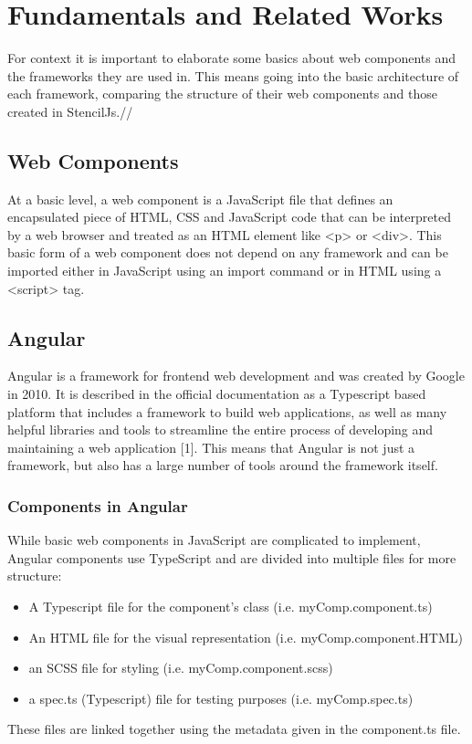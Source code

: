 \chapter{Fundamentals and Related Works}
\label{cha:Fundamentals}
For context it is important to elaborate some basics about web components and the frameworks they are used in. This means going into the basic architecture of each framework, comparing the structure of their web components and those created in StencilJs.//

\section{Web Components}
At a basic level, a web component is a JavaScript file that defines an encapsulated piece of HTML, CSS and JavaScript code that can be interpreted by a web browser and treated as an HTML element like <p> or <div>. This basic form of a web component does not depend on any framework and can be imported either in JavaScript using an import command or in HTML using a <script> tag.

\section{Angular}
Angular is a framework for frontend web development and was created by Google in 2010. It is described in the official documentation as a Typescript based platform that includes a framework to build web applications, as well as many helpful libraries and tools to streamline the entire process of developing and maintaining a web application [1]. This means that Angular is not just a framework, but also has a large number of tools around the framework itself.

\subsection{Components in Angular}
While basic web components in JavaScript are complicated to implement, Angular components use TypeScript and are divided into multiple files for more structure:

\begin{itemize}
\item A Typescript file for the component’s class (i.e. myComp.component.ts)
\item An HTML file for the visual representation (i.e. myComp.component.HTML)
\item an SCSS file for styling (i.e. myComp.component.scss)
\item a spec.ts (Typescript) file for testing purposes (i.e. myComp.spec.ts)
\end{itemize}
These files are linked together using the metadata given in the component.ts file.

